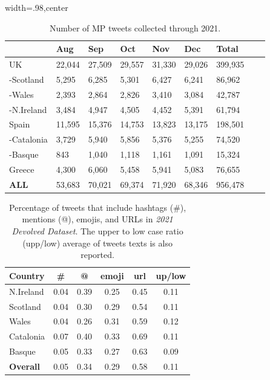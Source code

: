 \begin{table}[ht]
\begin{subtable}{\textwidth}
\centering
\begin{adjustbox}{width=.98\textwidth,center}
\begin{tabular}{|l|l|l|l|l|l|l|l|l|}
\hline
             & Aug   & Sep    & Oct    & Nov    & Dec    & \textbf{Total} \\ \hline
UK           & 22,044 & 27,509 & 29,557 & 31,330 & 29,026 & 399,935   \\ \hline
-Scotland    & 5,295  & 6,285  & 5,301  & 6,427  & 6,241  & 86,962    \\ \hline
-Wales       & 2,393  & 2,864  & 2,826  & 3,410  & 3,084  & 42,787    \\ \hline
-N.Ireland   & 3,484  & 4,947  & 4,505  & 4,452  & 5,391  & 61,794    \\ \hline
Spain        & 11,595 & 15,376 & 14,753 & 13,823 & 13,175 & 198,501   \\ \hline
-Catalonia   & 3,729  & 5,940  & 5,856  & 5,376  & 5,255  & 74,520    \\ \hline
-Basque      & 843    & 1,040  & 1,118  & 1,161  & 1,091  & 15,324    \\ \hline
Greece       & 4,300  & 6,060  & 5,458  & 5,941  & 5,083  & 76,655    \\ \hline
\textbf{ALL} & 53,683 & 70,021 & 69,374 & 71,920 & 68,346 & 956,478   \\ \hline
\end{tabular}
\end{adjustbox}
\caption{Number of MP tweets collected through 2021.}
\label{tab:Politics-tweets_collected}
\end{subtable}
\end{table}


\begin{table}[ht]
    \centering
    \begin{tabular}{lccccc}
    \textbf{Country} & \textbf{\#} & \textbf{@} & \textbf{emoji} & \textbf{url} & \textbf{up/low} \\ \hline
    N.Ireland               & 0.04        & 0.39       & 0.25           & 0.45         & 0.11            \\ \hline
    Scotland            & 0.04        & 0.30       & 0.29           & 0.54         & 0.11            \\ \hline
    Wales           & 0.04        & 0.26       & 0.31           & 0.59         & 0.12            \\ \hline
    Catalonia           & 0.07        & 0.40       & 0.33           & 0.69         & 0.11            \\ \hline
    Basque           & 0.05        & 0.33      & 0.27           & 0.63         & 0.09            \\ \hline
    \textbf{Overall} & 0.05        & 0.34       & 0.29           & 0.58         & 0.11           
    \end{tabular}
    \caption{Percentage of tweets that include  hashtags (\#), mentions (@), emojis, and URLs in \textit{2021 Devolved Dataset}. The upper to low case ratio (upp/low) average of tweets texts is also reported.}
    \label{tab:Politics-control_stats_devolved}
\end{table}

